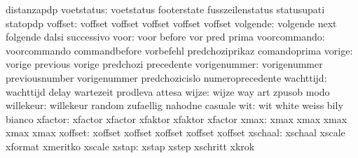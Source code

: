                            distanzapdp
               voetstatus: voetstatus                footerstate
                           fusszeilenstatus          statusupati
                           statopdp
                  voffset: voffset                   voffset
                           voffset                   voffset
                           voffset
                 volgende: volgende                  next
                           folgende                  dalsi
                           successivo
                     voor: voor                      before
                           vor                       pred
                           prima
             voorcommando: voorcommando              commandbefore
                           vorbefehl                 predchoziprikaz
                           comandoprima
                   vorige: vorige                    previous
                           vorige                    predchozi
                           precedente
             vorigenummer: vorigenummer              previousnumber
                           vorigenummer              predchozicislo
                           numeroprecedente
                wachttijd: wachttijd                 delay
                           wartezeit                 prodleva
                           attesa
                    wijze: wijze                     way
                           art                       zpusob
                           modo
                willekeur: willekeur                 random
                           zufaellig                 nahodne
                           casuale
                      wit: wit                       white
                           weiss                     bily
                           bianco
                  xfactor: xfactor                   xfactor
                           xfaktor                   xfaktor
                           xfactor                   %
                     xmax: xmax                      xmax
                           xmax                      xmax
                           xmax                      %
                  xoffset: xoffset                   xoffset
                           xoffset                   xoffset
                           xoffset                   %
                  xschaal: xschaal                   xscale
                           xformat                   xmeritko
                           xscale                    %
                    xstap: xstap                     xstep
                           xschritt                  xkrok
